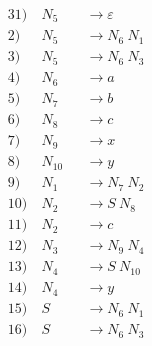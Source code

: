 \begin{alignat*}{3}
1) \ & N_5 &&\rightarrow \varepsilon \\
2) \ & N_5 &&\rightarrow N_6\ N_1 \\
3) \ & N_5 &&\rightarrow N_6\ N_3 \\
4) \ & N_6 &&\rightarrow a \\
5) \ & N_7 &&\rightarrow b \\
6) \ & N_8 &&\rightarrow c \\
7) \ & N_9 &&\rightarrow x \\
8) \ & N_10 &&\rightarrow y \\
9) \ & N_1 &&\rightarrow N_7\ N_2 \\
10) \ & N_2 &&\rightarrow S\ N_8 \\
11) \ & N_2 &&\rightarrow c \\
12) \ & N_3 &&\rightarrow N_9\ N_4 \\
13) \ & N_4 &&\rightarrow S\ N_10 \\
14) \ & N_4 &&\rightarrow y \\
15) \ & S &&\rightarrow N_6\ N_1 \\
16) \ & S &&\rightarrow N_6\ N_3 \\
\end{alignat*}